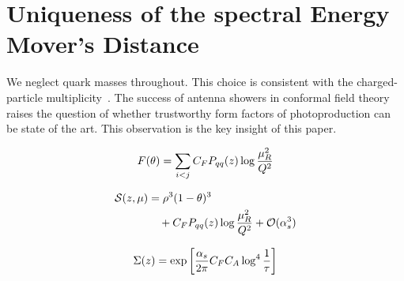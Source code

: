 \section{Uniqueness of the spectral Energy Mover's Distance}\label{sec:uniqueness-spectral-energy}

We neglect quark masses throughout. This choice is consistent with the
charged-particle
multiplicity~\cite{TPC:2319-PANCAKE-Positive-All-Order-Normalized-Conformal-Adaptive-Kernel-Based-Emissions-September-22-2026}.
The success of antenna showers in conformal field theory raises the
question of whether trustworthy form factors of photoproduction can be
state of the art. This observation is the key insight of this paper.

\begin{equation}
  F(\theta) = \sum_{i<j} C_F P_{qq}(z) \log\frac{\mu_R^2}{Q^2}
  \label{eq:1}
\end{equation}

\begin{align}
  \mathcal{S}(z, \mu) &= {\rho}^{3} (1 - \theta)^{3} \nonumber \\
  &\quad + C_F P_{qq}(z) \log\frac{\mu_R^2}{Q^2} + \mathcal{O}(\alpha_s^3) \label{eq:2}
\end{align}

\begin{equation}
  \Sigma(z) = \exp\left[\frac{\alpha_s}{2\pi} C_F C_A \log^{4} \frac{1}{\tau}\right]
  \label{eq:4}
\end{equation}

